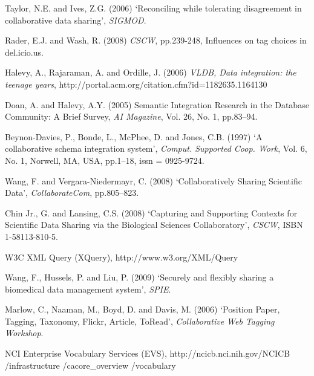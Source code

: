 \documentclass{singlecol-new}
\theoremstyle{TH}{
\newtheorem{lemma}{Lemma}
\newtheorem{theorem}[lemma]{Theorem}
\newtheorem{corrolary}[lemma]{Corrolary}
\newtheorem{conjecture}[lemma]{Conjecture}
\newtheorem{proposition}[lemma]{Proposition}
\newtheorem{claim}[lemma]{Claim}
\newtheorem{stheorem}[lemma]{Wrong Theorem}
\newtheorem{algorithm}{Algorithm}
}
\theoremstyle{THrm}{
\newtheorem{definition}{Definition}[section]
\newtheorem{question}{Question}[section]
\newtheorem{remark}{Remark}
\newtheorem{scheme}{Scheme}
}
\theoremstyle{THhit}{
\newtheorem{case}{Case}[section]
}
\begin{document}
\begin{thebibliography}{10}
Taylor, N.E. and Ives, Z.G. (2006) `Reconciling while tolerating
disagreement in collaborative data sharing', {\it SIGMOD}.

Rader, E.J. and Wash, R. (2008) {\it CSCW}, pp.239-248, Influences
on tag choices in del.icio.us.

Halevy, A., Rajaraman, A. and Ordille, J. (2006) {\it VLDB, Data
integration: the teenage years},
http://portal.acm.org/citation.cfm?id=1182635.1164130

Doan, A. and Halevy, A.Y. (2005) Semantic Integration Research in
the Database Community: A Brief Survey, {\it AI Magazine}, Vol. 26,
No. 1, pp.83--94.

Beynon-Davies, P., Bonde, L., McPhee, D. and Jones, C.B. (1997) `A
collaborative schema integration system', {\it Comput. Supported
Coop. Work}, Vol. 6, No. 1, Norwell, MA, USA, pp.1--18, issn =
0925-9724.

Wang, F. and Vergara-Niedermayr, C. (2008) `Collaboratively Sharing
Scientific Data', {\it CollaborateCom}, pp.805--823.

 Chin Jr., G. and Lansing,
C.S. (2008) `Capturing and Supporting Contexts for Scientific Data
Sharing via the Biological Sciences Collaboratory', {\it CSCW}, ISBN
1-58113-810-5.

W3C XML Query (XQuery), http://www.w3.org/XML/Query

Wang, F., Hussels, P. and Liu, P. (2009) `Securely and flexibly
sharing a biomedical data management system', {\it SPIE}.

Marlow, C., Naaman, M., Boyd, D. and Davis, M. (2006) `Position
Paper, Tagging, Taxonomy, Flickr, Article, ToRead', {\it
Collaborative Web Tagging Workshop}.

 NCI Enterprise Vocabulary Services (EVS),
http://ncicb.nci.nih.gov/NCICB /infrastructure /cacore\_overview
/vocabulary


\end{thebibliography}
\end{document}
